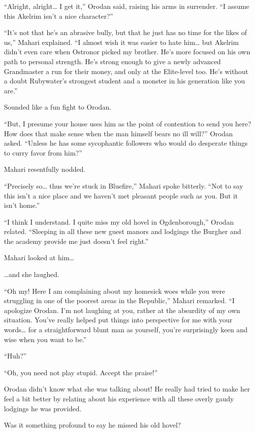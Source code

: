 \documentclass[a4paper,10pt]{book}
\begin{document}
“Alright, alright… I get it,” Orodan said, raising his arms in surrender. “I assume this Akelrim isn’t a nice character?”\par
“It’s not that he’s an abrasive bully, but that he just has no time for the likes of us,” Mahari explained. “I almost wish it was easier to hate him… but Akelrim didn’t even care when Ostronor picked my brother. He’s more focused on his own path to personal strength. He’s strong enough to give a newly advanced Grandmaster a run for their money, and only at the Elite-level too. He’s without a doubt Rubywater’s strongest student and a monster in his generation like you are.”\par
Sounded like a fun fight to Orodan.\par
“But, I presume your house uses him as the point of contention to send you here? How does that make sense when the man himself bears no ill will?” Orodan asked. “Unless he has some sycophantic followers who would do desperate things to curry favor from him?”\par
Mahari resentfully nodded.\par
“Precisely so… thus we’re stuck in Bluefire,” Mahari spoke bitterly. “Not to say this isn’t a nice place and we haven’t met pleasant people such as you. But it isn’t home.”\par
“I think I understand. I quite miss my old hovel in Ogdenborough,” Orodan related. “Sleeping in all these new guest manors and lodgings the Burgher and the academy provide me just doesn’t feel right.”\par
Mahari looked at him…\par
…and she laughed.\par
“Oh my! Here I am complaining about my homesick woes while you were struggling in one of the poorest areas in the Republic,” Mahari remarked. “I apologize Orodan. I’m not laughing at you, rather at the absurdity of my own situation. You’ve really helped put things into perspective for me with your words… for a straightforward blunt man as yourself, you’re surprisingly keen and wise when you want to be.”\par
“Huh?”\par
“Oh, you need not play stupid. Accept the praise!”\par
Orodan didn’t know what she was talking about! He really had tried to make her feel a bit better by relating about his experience with all these overly gaudy lodgings he was provided.\par
Was it something profound to say he missed his old hovel?\par
\end{document}
